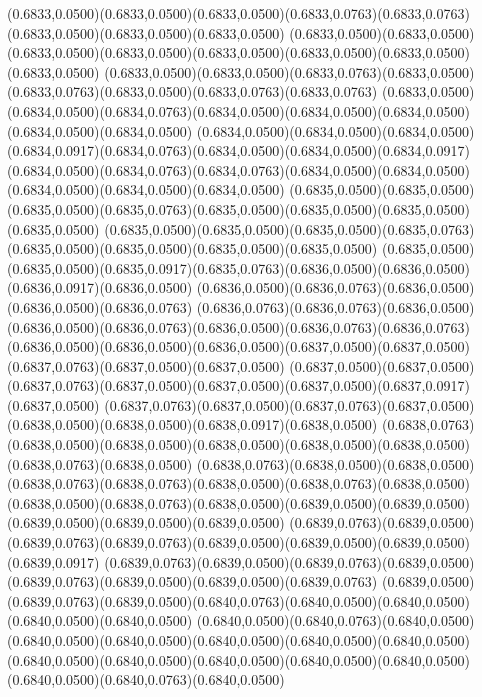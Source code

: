 (0.6833,0.0500)(0.6833,0.0500)(0.6833,0.0500)(0.6833,0.0763)(0.6833,0.0763)(0.6833,0.0500)(0.6833,0.0500)(0.6833,0.0500)
(0.6833,0.0500)(0.6833,0.0500)(0.6833,0.0500)(0.6833,0.0500)(0.6833,0.0500)(0.6833,0.0500)(0.6833,0.0500)(0.6833,0.0500)
(0.6833,0.0500)(0.6833,0.0500)(0.6833,0.0763)(0.6833,0.0500)(0.6833,0.0763)(0.6833,0.0500)(0.6833,0.0763)(0.6833,0.0763)
(0.6833,0.0500)(0.6834,0.0500)(0.6834,0.0763)(0.6834,0.0500)(0.6834,0.0500)(0.6834,0.0500)(0.6834,0.0500)(0.6834,0.0500)
(0.6834,0.0500)(0.6834,0.0500)(0.6834,0.0500)(0.6834,0.0917)(0.6834,0.0763)(0.6834,0.0500)(0.6834,0.0500)(0.6834,0.0917)
(0.6834,0.0500)(0.6834,0.0763)(0.6834,0.0763)(0.6834,0.0500)(0.6834,0.0500)(0.6834,0.0500)(0.6834,0.0500)(0.6834,0.0500)
(0.6835,0.0500)(0.6835,0.0500)(0.6835,0.0500)(0.6835,0.0763)(0.6835,0.0500)(0.6835,0.0500)(0.6835,0.0500)(0.6835,0.0500)
(0.6835,0.0500)(0.6835,0.0500)(0.6835,0.0500)(0.6835,0.0763)(0.6835,0.0500)(0.6835,0.0500)(0.6835,0.0500)(0.6835,0.0500)
(0.6835,0.0500)(0.6835,0.0500)(0.6835,0.0917)(0.6835,0.0763)(0.6836,0.0500)(0.6836,0.0500)(0.6836,0.0917)(0.6836,0.0500)
(0.6836,0.0500)(0.6836,0.0763)(0.6836,0.0500)(0.6836,0.0500)(0.6836,0.0763)
\PST@Solid(0.6836,0.0763)(0.6836,0.0763)(0.6836,0.0500)(0.6836,0.0500)(0.6836,0.0763)(0.6836,0.0500)(0.6836,0.0763)(0.6836,0.0763)
(0.6836,0.0500)(0.6836,0.0500)(0.6836,0.0500)(0.6837,0.0500)(0.6837,0.0500)(0.6837,0.0763)(0.6837,0.0500)(0.6837,0.0500)
(0.6837,0.0500)(0.6837,0.0500)(0.6837,0.0763)(0.6837,0.0500)(0.6837,0.0500)(0.6837,0.0500)(0.6837,0.0917)(0.6837,0.0500)
(0.6837,0.0763)(0.6837,0.0500)(0.6837,0.0763)(0.6837,0.0500)(0.6838,0.0500)(0.6838,0.0500)(0.6838,0.0917)(0.6838,0.0500)
(0.6838,0.0763)(0.6838,0.0500)(0.6838,0.0500)(0.6838,0.0500)(0.6838,0.0500)(0.6838,0.0500)(0.6838,0.0763)(0.6838,0.0500)
(0.6838,0.0763)(0.6838,0.0500)(0.6838,0.0500)(0.6838,0.0763)(0.6838,0.0763)(0.6838,0.0500)(0.6838,0.0763)(0.6838,0.0500)
(0.6838,0.0500)(0.6838,0.0763)(0.6838,0.0500)(0.6839,0.0500)(0.6839,0.0500)(0.6839,0.0500)(0.6839,0.0500)(0.6839,0.0500)
(0.6839,0.0763)(0.6839,0.0500)(0.6839,0.0763)(0.6839,0.0763)(0.6839,0.0500)(0.6839,0.0500)(0.6839,0.0500)(0.6839,0.0917)
(0.6839,0.0763)(0.6839,0.0500)(0.6839,0.0763)(0.6839,0.0500)(0.6839,0.0763)(0.6839,0.0500)(0.6839,0.0500)(0.6839,0.0763)
(0.6839,0.0500)(0.6839,0.0763)(0.6839,0.0500)(0.6840,0.0763)(0.6840,0.0500)(0.6840,0.0500)(0.6840,0.0500)(0.6840,0.0500)
(0.6840,0.0500)(0.6840,0.0763)(0.6840,0.0500)(0.6840,0.0500)(0.6840,0.0500)(0.6840,0.0500)(0.6840,0.0500)(0.6840,0.0500)
(0.6840,0.0500)(0.6840,0.0500)(0.6840,0.0500)(0.6840,0.0500)(0.6840,0.0500)(0.6840,0.0500)(0.6840,0.0763)(0.6840,0.0500)
